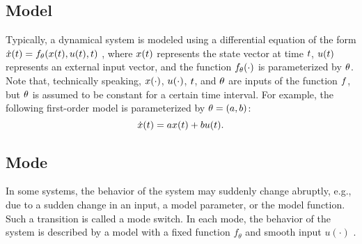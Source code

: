 \subsection{Model}
\label{sec:model}

Typically, a dynamical system is modeled using a differential equation of the form $\dot{x}(t)=f_{\theta}(x(t), u(t), t)$ \autocite{norman2011control}, where $x(t)$ represents the state vector at time $t$, $u(t)$ represents an external input vector, and the function $f_{\theta}(\cdot)$ is parameterized by $\theta$.  Note that, technically speaking, $x(\cdot)$, $u(\cdot)$, $t$, and $\theta$ are inputs of the function $f$, but $\theta$ is assumed to be constant for a certain time interval. For example, the following first-order model is parameterized by $\theta=(a,b)$:
\begin{equation}
	\dot{x}(t) = a x(t) + b u(t).
\end{equation}


\subsection{Mode}
\label{sec:mode}

In some systems, the behavior of the system may suddenly change abruptly, e.g., due to a sudden change in an input, a model parameter, or the model function. Such a transition is called a mode switch.
In each mode, the behavior of the system is described by a model with a fixed function $f_{\theta}$ and smooth input $u(\cdot)$ \autocite{deschutter2000optimal}.







